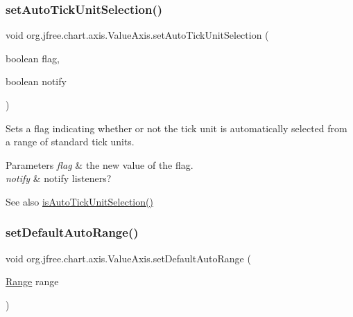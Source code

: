 \subsubsection{\texorpdfstring{set\+Auto\+Tick\+Unit\+Selection()}{setAutoTickUnitSelection()}\hspace{0.1cm}{\footnotesize\ttfamily [2/2]}}
{\footnotesize\ttfamily void org.\+jfree.\+chart.\+axis.\+Value\+Axis.\+set\+Auto\+Tick\+Unit\+Selection (\begin{DoxyParamCaption}\item[{boolean}]{flag,  }\item[{boolean}]{notify }\end{DoxyParamCaption})}

Sets a flag indicating whether or not the tick unit is automatically selected from a range of standard tick units.


\begin{DoxyParams}{Parameters}
{\em flag} & the new value of the flag. \\
\hline
{\em notify} & notify listeners?\\
\hline
\end{DoxyParams}
\begin{DoxySeeAlso}{See also}
\mbox{\hyperlink{classorg_1_1jfree_1_1chart_1_1axis_1_1_value_axis_adc265a92cee6f4f50dcf0701f86d3cab}{is\+Auto\+Tick\+Unit\+Selection()}} 
\end{DoxySeeAlso}
\mbox{\label{classorg_1_1jfree_1_1chart_1_1axis_1_1_value_axis_aa226504260af86620b2adac63cf2a7c8}} 
\subsubsection{\texorpdfstring{set\+Default\+Auto\+Range()}{setDefaultAutoRange()}}
{\footnotesize\ttfamily void org.\+jfree.\+chart.\+axis.\+Value\+Axis.\+set\+Default\+Auto\+Range (\begin{DoxyParamCaption}\item[{\mbox{\hyperlink{classorg_1_1jfree_1_1data_1_1_range}{Range}}}]{range }\end{DoxyParamCaption})}

